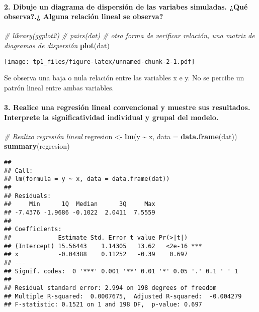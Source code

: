 \documentclass[
]{article}
\newenvironment{Shaded}{\begin{snugshade}}{\end{snugshade}}
\newcommand{\AttributeTok}[1]{\textcolor[rgb]{0.13,0.29,0.53}{#1}}
\newcommand{\CommentTok}[1]{\textcolor[rgb]{0.56,0.35,0.01}{\textit{#1}}}
\newcommand{\FunctionTok}[1]{\textcolor[rgb]{0.13,0.29,0.53}{\textbf{#1}}}
\newcommand{\NormalTok}[1]{#1}
\newcommand{\OtherTok}[1]{\textcolor[rgb]{0.56,0.35,0.01}{#1}}
\newcommand{\SpecialCharTok}[1]{\textcolor[rgb]{0.81,0.36,0.00}{\textbf{#1}}}
\begin{document}
\hypertarget{dibuje-un-diagrama-de-dispersiuxf3n-de-las-variabes-simuladas.-quuxe9-observa.-alguna-relaciuxf3n-lineal-se-observa}{%
\paragraph{2. Dibuje un diagrama de dispersión de las variabes
simuladas. ¿Qué observa?.¿ Alguna relación lineal se
observa?}\label{dibuje-un-diagrama-de-dispersiuxf3n-de-las-variabes-simuladas.-quuxe9-observa.-alguna-relaciuxf3n-lineal-se-observa}}

\begin{Shaded}
\begin{Highlighting}[]
\CommentTok{\# library(ggplot2)}
\CommentTok{\# pairs(dat) \# otra forma de verificar relación, una matriz de diagramas de dispersión}
\FunctionTok{plot}\NormalTok{(dat)}
\end{Highlighting}
\end{Shaded}

\texttt{[image: tp1\_files/figure-latex/unnamed-chunk-2-1.pdf]}

Se observa una baja o nula relación entre las variables x e y. No se
percibe un patrón lineal entre ambas variables.

\hypertarget{realice-una-regresiuxf3n-lineal-convencional-y-muestre-sus-resultados.-interprete-la-significatividad-individual-y-grupal-del-modelo.}{%
\paragraph{3. Realice una regresión lineal convencional y muestre sus
resultados. Interprete la significatividad individual y grupal del
modelo.}\label{realice-una-regresiuxf3n-lineal-convencional-y-muestre-sus-resultados.-interprete-la-significatividad-individual-y-grupal-del-modelo.}}

\begin{Shaded}
\begin{Highlighting}[]
\CommentTok{\# Realizo regresión lineal }
\NormalTok{regresion }\OtherTok{\textless{}{-}} \FunctionTok{lm}\NormalTok{(y }\SpecialCharTok{\textasciitilde{}}\NormalTok{ x, }\AttributeTok{data =} \FunctionTok{data.frame}\NormalTok{(dat))}
\FunctionTok{summary}\NormalTok{(regresion)}
\end{Highlighting}
\end{Shaded}

\begin{verbatim}
## 
## Call:
## lm(formula = y ~ x, data = data.frame(dat))
## 
## Residuals:
##     Min      1Q  Median      3Q     Max 
## -7.4376 -1.9686 -0.1022  2.0411  7.5559 
## 
## Coefficients:
##             Estimate Std. Error t value Pr(>|t|)    
## (Intercept) 15.56443    1.14305   13.62   <2e-16 ***
## x           -0.04388    0.11252   -0.39    0.697    
## ---
## Signif. codes:  0 '***' 0.001 '**' 0.01 '*' 0.05 '.' 0.1 ' ' 1
## 
## Residual standard error: 2.994 on 198 degrees of freedom
## Multiple R-squared:  0.0007675,  Adjusted R-squared:  -0.004279 
## F-statistic: 0.1521 on 1 and 198 DF,  p-value: 0.697
\end{verbatim}
\end{document}
